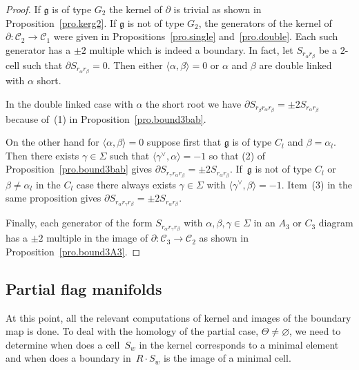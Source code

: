 \documentclass[pdftex]{sigma}
\numberwithin{equation}{section}
\begin{document}
\begin{proof}If $\mathfrak{g}$ is of type $G_{2}$ the kernel of $\partial $ is trivial as shown in Proposition~\ref{pro.kerg2}. If $\mathfrak{g}$ is not of type $G_{2} $, the generators of the kernel of $\partial\colon \mathcal{C}_{2}\longrightarrow \mathcal{C}_{1}$ were given in Propositions~\ref{pro.single} and~\ref{pro.double}. Each such generator has a $\pm 2$ multiple which is indeed a boundary. In fact, let $S_{r_{\alpha }r_{\beta }}$ be a $2$-cell such that $\partial S_{r_{\alpha }r_{\beta }}=0$. Then either $\langle \alpha,\beta \rangle =0$ or $\alpha $ and $\beta $ are double linked with $\alpha $ short.

In the double linked case with $\alpha $ the short root we have $\partial S_{r_{\beta }r_{\alpha }r_{\beta }}=\pm 2S_{r_{\alpha }r_{\beta }}$ because of~(1) in Proposition~\ref{pro.bound3bab}.

On the other hand for $ \langle \alpha,\beta \rangle =0$ suppose first that $\mathfrak{g}$ is of type $C_{l}$ and $\beta =\alpha _{l}$. Then there exists $\gamma \in \Sigma $ such that $ \langle \gamma ^{\vee},\alpha \rangle =-1$ so that (2) of Proposition~\ref{pro.bound3bab} gives $\partial S_{r_{\gamma }r_{\alpha }r_{\beta }}=\pm 2S_{r_{\alpha}r_{\beta }}$. If~$\mathfrak{g}$ is not of type $C_{l}$ or $\beta \neq \alpha _{l}$ in the $C_{l}$ case there always exists $\gamma \in \Sigma $ with $\langle \gamma ^{\vee },\beta \rangle =-1$. Item~(3) in the same proposition gives $\partial S_{r_{\alpha }r_{\gamma }r_{\beta }}=\pm 2S_{r_{\alpha }r_{\beta }}$.

Finally, each generator of the form $S_{r_{\alpha }r_{\gamma }r_{\beta }}$ with $\alpha,\beta,\gamma \in \Sigma $ in an $A_{3}$ or $C_{3}$ diagram has a $\pm 2$ multiple in the image of $\partial\colon \mathcal{C}_{3}\longrightarrow \mathcal{C}_{2}$ as shown in Proposition~\ref{pro.bound3A3}.
\end{proof}

\subsection{Partial flag manifolds}

At this point, all the relevant computations of kernel and images of the boundary map is done. To deal with the homology of the partial case, $\Theta \neq \varnothing$, we need to determine when does a cell~$S_{w}$ in the kernel corresponds to a minimal element and when does a boundary in~$R\cdot S_{w}$ is the image of a minimal cell.
\end{document}
